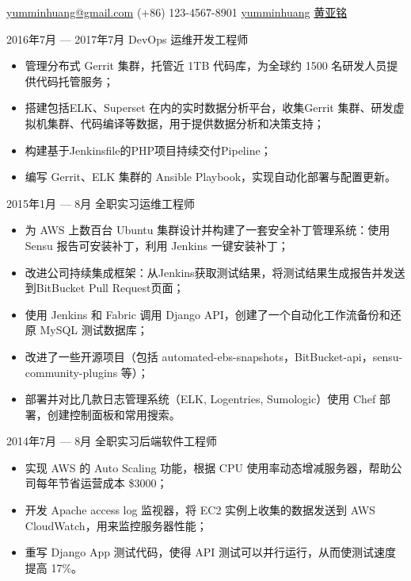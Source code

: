 \documentclass{resume}
\begin{document}
{\href{mailto:yumminhuang@gmail.com}{yumminhuang@gmail.com}}
{(+86) 123-4567-8901}
{\href{https://github.com/yumminhuang}{yumminhuang}}
{\href{https://www.linkedin.com/in/yaming-huang-6a09325b/zh-cn}{黄亚铭}}
{}


\begin{body}
	{2016年7月 --- 2017年7月}
	{DevOps 运维开发工程师}{}
	\begin{itemize}[noitemsep,topsep=0pt]
		\item 管理分布式 Gerrit 集群，托管近 1TB 代码库，为全球约 1500 名研发人员提供代码托管服务；
		\item 搭建包括ELK、Superset 在内的实时数据分析平台，收集Gerrit 集群、研发虚拟机集群、代码编译等数据，用于提供数据分析和决策支持；
		\item 构建基于Jenkinsfile的PHP项目持续交付Pipeline；
		\item 编写 Gerrit、ELK 集群的 Ansible Playbook，实现自动化部署与配置更新。
	\end{itemize}
\end{body}

\begin{body}
	{2015年1月 --- 8月}
	{全职实习运维工程师}{}
	\begin{itemize}[noitemsep,topsep=0pt]
		\item 为 AWS 上数百台 Ubuntu 集群设计并构建了一套安全补丁管理系统：使用 Sensu 报告可安装补丁，利用 Jenkins 一键安装补丁；
		\item 改进公司持续集成框架：从Jenkins获取测试结果，将测试结果生成报告并发送到BitBucket Pull Request页面；
		\item 使用 Jenkins 和 Fabric 调用 Django API，创建了一个自动化工作流备份和还原 MySQL 测试数据库；
		\item 改进了一些开源项目（包括 automated-ebs-snapshots，BitBucket-api，sensu-community-plugins 等）；
		\item 部署并对比几款日志管理系统（ELK, Logentries, Sumologic）使用 Chef 部署，创建控制面板和常用搜索。
	\end{itemize}
\end{body}

\begin{body}
	{2014年7月 --- 8月}
	{全职实习后端软件工程师}{}
	\begin{itemize}[noitemsep,topsep=0pt]
		\item 实现 AWS 的 Auto Scaling 功能，根据 CPU 使用率动态增减服务器，帮助公司每年节省运营成本 \$3000；
		\item 开发 Apache access log 监视器，将 EC2 实例上收集的数据发送到 AWS CloudWatch，用来监控服务器性能；
		\item 重写 Django App 测试代码，使得 API 测试可以并行运行，从而使测试速度提高 17\%。
	\end{itemize}
\end{body}
\end{document}
